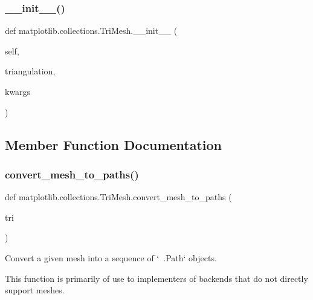 \subsubsection{\texorpdfstring{\+\_\+\+\_\+init\+\_\+\+\_\+()}{\_\_init\_\_()}}
{\footnotesize\ttfamily def matplotlib.\+collections.\+Tri\+Mesh.\+\_\+\+\_\+init\+\_\+\+\_\+ (\begin{DoxyParamCaption}\item[{}]{self,  }\item[{}]{triangulation,  }\item[{}]{kwargs }\end{DoxyParamCaption})}



\subsection{Member Function Documentation}
\mbox{\label{classmatplotlib_1_1collections_1_1TriMesh_aa2e77241c427696df188e93a395872d9}} 
\subsubsection{\texorpdfstring{convert\+\_\+mesh\+\_\+to\+\_\+paths()}{convert\_mesh\_to\_paths()}}
{\footnotesize\ttfamily def matplotlib.\+collections.\+Tri\+Mesh.\+convert\+\_\+mesh\+\_\+to\+\_\+paths (\begin{DoxyParamCaption}\item[{}]{tri }\end{DoxyParamCaption})\hspace{0.3cm}{\ttfamily [static]}}

\begin{DoxyVerb}Convert a given mesh into a sequence of `~.Path` objects.

This function is primarily of use to implementers of backends that do
not directly support meshes.
\end{DoxyVerb}
 \mbox{\label{classmatplotlib_1_1collections_1_1TriMesh_a1fe06ba65fadcbd6c7de143370473956}} 
